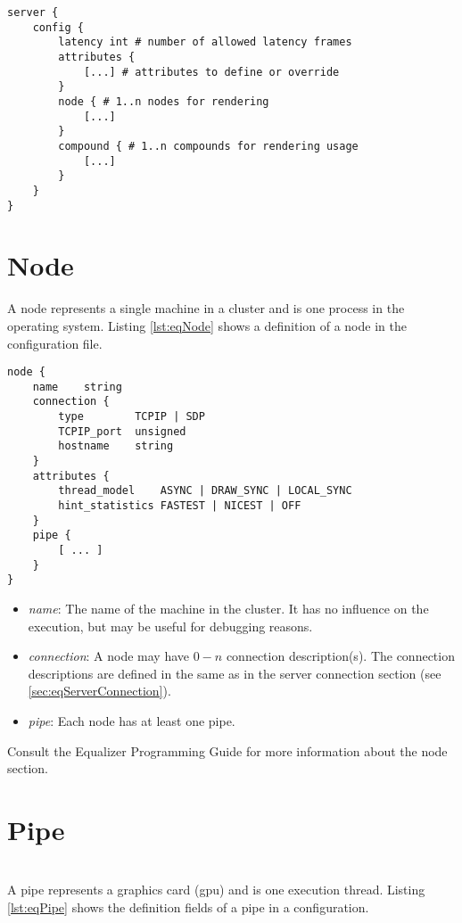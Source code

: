 \begin{lstlisting}[language=vrml,caption={config section in Equalizer configuration},label={lst:eqConfig}]
server {
	config {
		latency	int	# number of allowed latency frames
		attributes {
			[...] # attributes to define or override
		}
		node { # 1..n nodes for rendering
			[...]
		}
		compound { # 1..n compounds for rendering usage
			[...]
		}
	}
}
\end{lstlisting}

\section{Node}
\label{sec:eqNode}
A node represents a single machine in a cluster and is one process in the operating system. Listing \ref{lst:eqNode} shows a definition of a node in the configuration file.

\begin{lstlisting}[language=vrml,caption={node section in configuration file},label={lst:eqNode}]
node {
	name	string
	connection { 
		type		TCPIP | SDP
		TCPIP_port	unsigned
		hostname	string
	}
	attributes {
		thread_model	ASYNC | DRAW_SYNC | LOCAL_SYNC
		hint_statistics	FASTEST | NICEST | OFF
	}
	pipe {
		[ ... ]
	}
}
\end{lstlisting}

\begin{itemize}
	\item \emph{name}: The name of the machine in the cluster. It has no influence on the execution, but may be useful for debugging reasons.
	\item \emph{connection}: A node may have $0-n$ connection description(s). The connection descriptions are defined in the same as in the server connection section (see \ref{sec:eqServerConnection}).
	\item \emph{pipe}: Each node has at least one pipe.
\end{itemize}

Consult the Equalizer Programming Guide \cite[p. 66]{eqPG} for more information about the node section.

\section{Pipe}
\label{sec:eqPipe}\hfill\\
A pipe represents a graphics card (\gls{gpu}) and is one execution thread. Listing \ref{lst:eqPipe} shows the definition fields of a pipe in a configuration.

